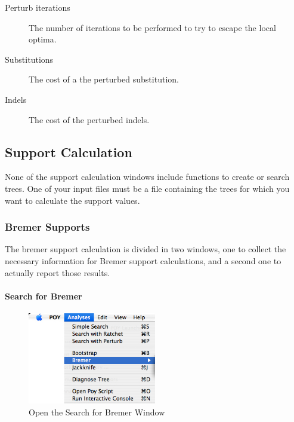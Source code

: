 \begin{description}
    \item[Perturb iterations] The number of iterations to be performed to try to
        escape the local optima.
    \item[Substitutions] The cost of a the perturbed substitution.
    \item[Indels] The cost of the perturbed indels.
\end{description}

\subsection{Support Calculation}

None of the support calculation windows include functions to create or search
trees. One of your input files must be a file containing the trees for which you
want to calculate the support values.

\subsubsection{Bremer Supports}

The bremer support calculation is divided in two windows, one to collect the
necessary information for Bremer support calculations, and a second one to
actually report those results. 

\paragraph{Search for Bremer}

\begin{figure}[htpb]
    \begin{center}
        \includegraphics[width=0.5\textwidth]{figures/SearchForBremer_Menu.jpg}
    \end{center}
    \caption{Open the Search for Bremer Window}
    \label{fig:search_for_bermer_menu}
\end{figure}

